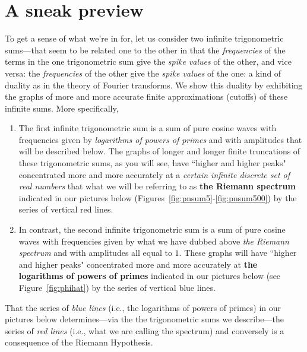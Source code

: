 \documentclass[openany]{book}
\theoremstyle{plain}
\theoremstyle{definition}
\begin{document}
{{\chapter{ A sneak preview}\label{snpr}

To get a sense of what we're in for, let us consider two infinite trigonometric sums---that seem to be related one to the other in that the {\it frequencies} of the terms in the one trigonometric sum give the {\it spike values} of the other, and vice versa:   the {\it frequencies} of the other give the {\it spike values} of the one: a kind of duality as in the theory of Fourier transforms. We show this duality by exhibiting the graphs of more and more accurate finite approximations (cutoffs) of these infinite sums. More specifically,

\begin{enumerate}\item The first infinite trigonometric sum is a sum of pure cosine waves with frequencies given by {\it logarithms of powers of primes} and with amplitudes that will be described below. The graphs of longer and longer finite truncations of these trigonometric sums, as you will see, have ``higher and higher peaks" concentrated more and more accurately at a  {\it certain infinite discrete set of real numbers} that what we will be referring to as {\bf the Riemann spectrum} indicated in our pictures below (Figures~\ref{fig:pnsum5}-\ref{fig:pnsum500}) by the series of vertical red lines.

\item  In contrast, the second infinite trigonometric sum is a sum of pure cosine waves with frequencies given by what we have dubbed above {\it the Riemann spectrum} and with amplitudes all equal to $1$. These graphs will have ``higher and higher peaks" concentrated more and more accurately at {\bf the logarithms of powers of primes} indicated in our pictures below (see Figure~\ref{fig:phihat}) by the series of vertical blue lines.

               \end{enumerate}




That the series of {\it blue lines} (i.e., the logarithms of powers of
primes) in our pictures below determines---via the the trigonometric
sums we describe---the series of {\it red lines} (i.e., what we are
calling the spectrum) and conversely is a consequence of the Riemann
Hypothesis.
\begin{enumerate}


\end{enumerate}}}
\end{document}
